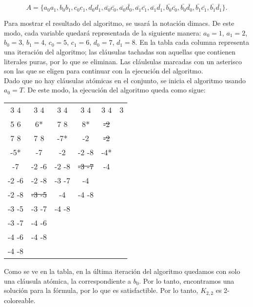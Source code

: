\documentclass[letterpaper,12pt]{article}
\theoremstyle{definition}
\begin{document}
\begin{equation}
  A = \{ a_0a_1, b_0b_1, c_0c_1, d_0d_1, \bar{a_0}\bar{c_0}, \bar{a_0}\bar{d_0}, \bar{a_1}\bar{c_1}, \bar{a_1}\bar{d_1}, \bar{b_0}\bar{c_0}, \bar{b_0}\bar{d_0}, \bar{b_1}\bar{c_1}, \bar{b_1}\bar{d_1}\}.
\end{equation}

Para mostrar el resultado del algoritmo, se usará la notación dimacs. De este modo, cada variable quedará representada de la siguiente manera: \(a_0 = 1\), \(a_1 = 2\), \(b_0 = 3\), \(b_1 = 4\), \(c_0 = 5\), \(c_1= 6\), \(d_0 = 7\), \(d_1 = 8\). En la tabla cada columna representa una iteración del algoritmo; las cláusulas tachadas son aquellas que contienen literales puras, por lo que se eliminan. Las cláulsulas marcadas con un asterisco son las que se eligen para continuar con la ejecución del algoritmo.\\

Dado que no hay cláusulas atómicas en el conjunto, se inicia el algoritmo usando \(a_0 = T\). De este modo, la ejecución del algoritmo queda como sigue:


  \begin{table}[h]
    \centering
    \begin{tabular}{ |c|c|c|c|c|c| } 
      \hline
      3 4   & 3 4        & 3 4   & 3 4        & 3 4     & 3 \\
      5 6   & 6*         & 7 8   & 8*         & \st{-2} &   \\
      7 8   & 7 8        & -7*   & -2         & \st{-2} &   \\
      -5*   & -7         & -2    & -2 -8      & -4*     &   \\
      -7    & -2 -6      & -2 -8 & \st{-3 -7} & -4      &   \\
      -2 -6 & -2 -8      & -3 -7 & -4         &         &   \\
      -2 -8 & \st{-3 -5} & -4    & -4 -8      &         &   \\
      -3 -5 & -3 -7      & -4 -8 &            &         &   \\
      -3 -7 & -4 -6      &       &            &         &   \\
      -4 -6 & -4 -8      &       &            &         &   \\
      -4 -8 &            &       &            &         &   \\
      \hline
    \end{tabular}
  \end{table}


Como se ve en la tabla, en la última iteración del algoritmo quedamos con solo una cláusula atómica, la correspondiente a \(b_0\). Por lo tanto, encontramos una solución para la fórmula, por lo que es satisfactible. Por lo tanto, \(K_{2,2}\) es 2-coloreable.
\end{document}
